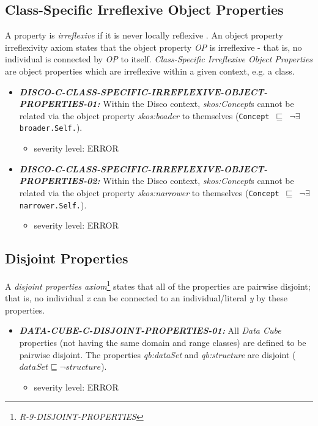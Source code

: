 \documentclass{llncs}
\newcommand{\ms}[1]{\texttt{#1}}
\begin{document}
\subsection{Class-Specific Irreflexive Object Properties}

A property is \emph{irreflexive} if it is never locally reflexive \cite{Kroetzsch2012}.
An object property irreflexivity axiom states that the object property \emph{OP} is irreflexive - that is, no individual is connected by \emph{OP} to itself.
\emph{Class-Specific Irreflexive Object Properties} are object properties which are irreflexive within a given context, e.g. a class. 

\begin{itemize}
  \item \textbf{{\em DISCO-C-CLASS-SPECIFIC-IRREFLEXIVE-OBJECT-PROPERTIES-01:}}
Within the Disco context, {\em skos:Concept}s cannot be related via the object property {\em skos:boader} to themselves (\ms{Concept $\sqsubseteq$ $\neg$$\exists$ broader.Self.}). 
	\begin{itemize}
		\item severity level: ERROR
	\end{itemize}
	\item \textbf{{\em DISCO-C-CLASS-SPECIFIC-IRREFLEXIVE-OBJECT-PROPERTIES-02:}}
Within the Disco context, {\em skos:Concept}s cannot be related via the object property {\em skos:narrower} to themselves (\ms{Concept $\sqsubseteq$ $\neg$$\exists$ narrower.Self.}). 
	\begin{itemize}
		\item severity level: ERROR
	\end{itemize}
\end{itemize}

\subsection{Disjoint Properties}

A \emph{disjoint properties axiom}\footnote{\emph{R-9-DISJOINT-PROPERTIES}} states that all of the properties are pairwise disjoint; 
that is, no individual \emph{x} can be connected to an individual/literal \emph{y} by these properties. 

\begin{itemize}
	\item \textbf{{\em DATA-CUBE-C-DISJOINT-PROPERTIES-01:}} 
	All \emph{Data Cube} properties (not having the same domain and range classes) are defined to be pairwise disjoint.
  The properties \emph{qb:dataSet} and \emph{qb:structure} are disjoint ($dataSet \sqsubseteq \neg structure$).
	\begin{itemize}
		\item severity level: ERROR
	\end{itemize}
\end{itemize}
\end{document}
